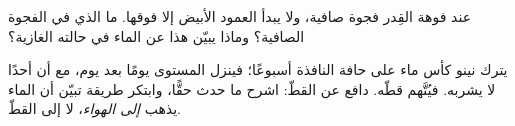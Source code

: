 \begin{exercise}[$\star\star$]\label{exo:g2:ice-water-steam:9}
عند فوهة القِدر فجوة صافية، ولا يبدأ العمود الأبيض إلا فوقها.
ما الذي في الفجوة الصافية؟ وماذا يبيّن هذا عن الماء في حالته
الغازية؟
\end{exercise}

\begin{exercise}[$\star\star$]\label{exo:g2:ice-water-steam:10}
يترك نينو كأس ماء على حافة النافذة أسبوعًا؛ فينزل المستوى يومًا
بعد يوم، مع أن أحدًا لا يشربه. فيُتَّهم قطّه. دافع عن القطّ:
اشرح ما حدث حقًّا، وابتكر طريقة تبيّن أن الماء يذهب \emph{إلى
الهواء}، لا إلى القطّ.
\end{exercise}
